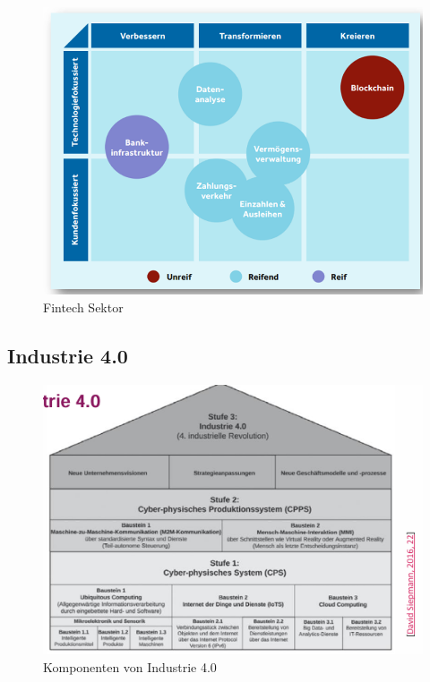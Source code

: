 \documentclass[../Main.tex]{subfiles}
\begin{document}
\begin{figure}[H]
    \centering
    \includegraphics[width=1\linewidth]{Images/digbus/fintech.png}
    \caption{Fintech Sektor}
\end{figure}

\subsection{Industrie 4.0}

\begin{figure}[H]
    \centering
    \includegraphics[width=1\linewidth]{Images/digbus/40elemente.png}
    \caption{Komponenten von Industrie 4.0}
\end{figure}
\end{document}
